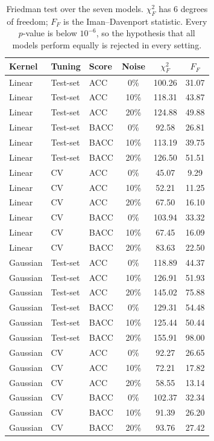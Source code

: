 \begin{table}[!t]
\centering
\caption{Friedman test over the seven models. $\chi^2_F$ has 6 degrees of freedom; $F_F$ is the Iman--Davenport statistic. Every $p$-value is below $10^{-6}$, so the hypothesis that all models perform equally is rejected in every setting.}
\label{tab:friedman}
\small
\begin{tabular}{lllccc}
\toprule
Kernel & Tuning & Score & Noise & $\chi^2_F$ & $F_F$ \\
\midrule
Linear & Test-set & ACC & 0\% & 100.26 & 31.07 \\
Linear & Test-set & ACC & 10\% & 118.31 & 43.87 \\
Linear & Test-set & ACC & 20\% & 124.88 & 49.88 \\
Linear & Test-set & BACC & 0\% & 92.58 & 26.81 \\
Linear & Test-set & BACC & 10\% & 113.19 & 39.75 \\
Linear & Test-set & BACC & 20\% & 126.50 & 51.51 \\
Linear & CV & ACC & 0\% & 45.07 & 9.29 \\
Linear & CV & ACC & 10\% & 52.21 & 11.25 \\
Linear & CV & ACC & 20\% & 67.50 & 16.10 \\
Linear & CV & BACC & 0\% & 103.94 & 33.32 \\
Linear & CV & BACC & 10\% & 67.45 & 16.09 \\
Linear & CV & BACC & 20\% & 83.63 & 22.50 \\
Gaussian & Test-set & ACC & 0\% & 118.89 & 44.37 \\
Gaussian & Test-set & ACC & 10\% & 126.91 & 51.93 \\
Gaussian & Test-set & ACC & 20\% & 145.02 & 75.88 \\
Gaussian & Test-set & BACC & 0\% & 129.31 & 54.48 \\
Gaussian & Test-set & BACC & 10\% & 125.44 & 50.44 \\
Gaussian & Test-set & BACC & 20\% & 155.91 & 98.00 \\
Gaussian & CV & ACC & 0\% & 92.27 & 26.65 \\
Gaussian & CV & ACC & 10\% & 72.21 & 17.82 \\
Gaussian & CV & ACC & 20\% & 58.55 & 13.14 \\
Gaussian & CV & BACC & 0\% & 102.37 & 32.34 \\
Gaussian & CV & BACC & 10\% & 91.39 & 26.20 \\
Gaussian & CV & BACC & 20\% & 93.76 & 27.42 \\
\bottomrule
\end{tabular}
\end{table}
